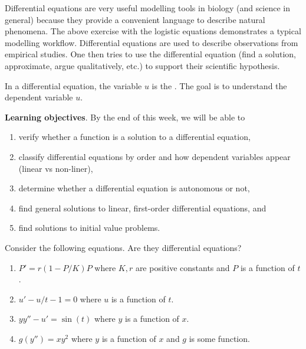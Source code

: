 \documentclass[../main.tex]{subfiles}
\begin{document}
Differential equations are very useful modelling tools in biology (and science in general) because they provide a convenient language to describe natural phenomena.  The above exercise with the logistic equations demonstrates a typical modelling workflow. Differential equations are used to describe observations from empirical studies. One then tries to use the differential equation (find a solution, approximate, argue qualitatively, etc.) to support their scientific hypothesis.

\faExclamationTriangle{} In a differential equation, the  variable \(u\) is the . The goal is to understand the dependent variable \(u\). 

\faStar{} \textbf{Learning objectives}. By the end of this week, we will be able to
\begin{enumerate}
  \item verify whether a function is a solution to a differential equation, 
  \item classify differential equations by order and how dependent variables appear (linear vs non-liner),
  \item determine whether a differential equation is autonomous or not, 
  \item find general solutions to linear, first-order differential equations, and
  \item find solutions to initial value problems.
\end{enumerate}

\begin{example}
  Consider the following equations. Are they differential equations?

  \begin{enumerate}
    \item \(P' = r (1 - P/K) P\) where \(K, r\) are positive constants and \(P\) is a function of \(t\).
    \item \(u' - u/t - 1 = 0\) where \(u\) is a function of \(t\).
    \item \(y y'' - u' = \sin(t)\) where \(y\) is a function of \(x\).
    \item \(g(y'') = xy^{2}\) where \(y\) is a function of \(x\) and \(g\) is some function.
  \end{enumerate}
\end{example}
\end{document}
